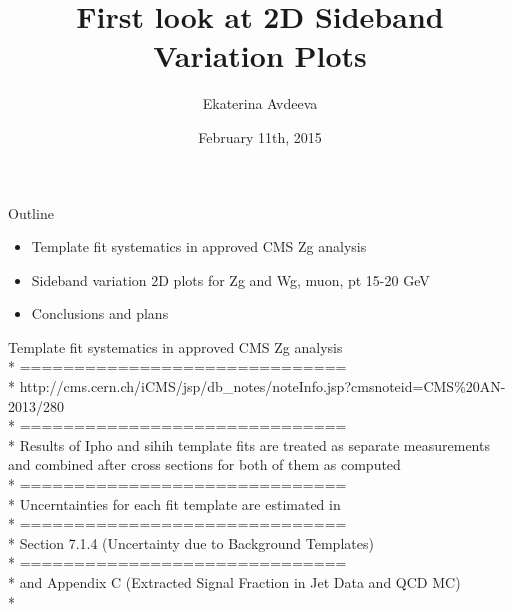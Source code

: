 \documentclass{beamer}
\title{First look at 2D Sideband Variation Plots}
\author{Ekaterina Avdeeva}
\institute{University of Nebraska - Lincoln}
\date{February 11th, 2015}
\begin{document}
\begin{frame}
\titlepage
\end{frame}

\begin{frame}{Outline}
{
  \begin{itemize}
  \item Template fit systematics in approved CMS Zg analysis 
  \item Sideband variation 2D plots for Zg and Wg, muon, pt 15-20 GeV
  \item Conclusions and plans
  \end{itemize}
}
\end{frame}


\begin{frame}{Template fit systematics in approved CMS Zg analysis}\\*
  \scriptsize ==============================\\*
  \scriptsize http://cms.cern.ch/iCMS/jsp/db\_notes/noteInfo.jsp?cmsnoteid=CMS\%20AN-2013/280\\*
  \scriptsize ==============================\\*
  \scriptsize Results of Ipho and sihih template fits are treated as separate measurements and combined after cross sections for both of them as computed\\*
  \scriptsize ==============================\\*
  \scriptsize Uncerntainties for each fit template are estimated in\\*
  \scriptsize ==============================\\*
  \scriptsize Section 7.1.4 (Uncertainty due to Background Templates)\\*
  \scriptsize ==============================\\*
  \scriptsize and Appendix C (Extracted Signal Fraction in Jet Data and QCD MC)\\*
\end{frame}
\end{document}

